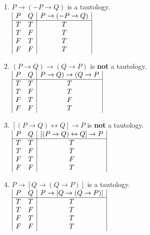 \documentclass{article}
\begin{document}
\begin{enumerate}[label=(\alph*)]
\item \(P \rightarrow (-P \rightarrow Q)\) is a tautology.\\
\(
\begin{array}{|c c|c|}
P & Q & P \rightarrow (-P \rightarrow Q)\\
\hline
T & T & T\\
T & F & T\\
F & T & T\\
F & F & T\\
\end{array}
\)
\medskip

\item \((P \rightarrow Q) \rightarrow (Q \rightarrow P)\) is \textbf{not} a tautology.\\
\(
\begin{array}{|c c|c|}
P & Q & P \rightarrow Q) \rightarrow (Q \rightarrow P\\
\hline
T & T & T\\
T & F & T\\
F & T & F\\
F & F & T\\
\end{array}
\)
\medskip

\item \([(P \rightarrow Q) \leftrightarrow Q] \rightarrow P\) is \textbf{not} a tautology.\\
\(
\begin{array}{|c c|c|}
P & Q &[(P \rightarrow Q) \leftrightarrow Q] \rightarrow P\\
\hline
T & T & T\\
T & F & T\\
F & T & F\\
F & F & T\\
\end{array}
\)
\medskip

\item \(P \rightarrow [Q \rightarrow (Q \rightarrow P)]\) is a tautology.\\
\(
\begin{array}{|c c|c|}
P & Q & P \rightarrow [Q \rightarrow (Q \rightarrow P)]\\
\hline
T & T & T\\
T & F & T\\
F & T & T\\
F & F & T\\
\end{array}
\)
\medskip


\end{enumerate}
\end{document}
